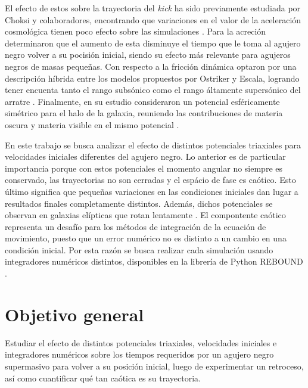 	El efecto de estos sobre la trayectoria del \textit{kick} ha sido previamente estudiada por Choksi y colaboradores, encontrando que variaciones en el valor de la aceleraci\'on cosmol\'ogica tienen poco efecto sobre las simulaciones  \cite{choksi2017recoiling}. Para la acreci\'on determinaron que el aumento de esta disminuye el tiempo que le toma al agujero negro volver a su pocisi\'on inicial, siendo su efecto m\'as relevante para agujeros negros de masas peque\~nas. Con respecto a la fricci\'on din\'amica optaron por una descripci\'on h\'ibrida entre los modelos propuestos por Ostriker y Escala, logrando tener encuenta tanto el rango subs\'onico como el rango \'altamente supers\'onico del arratre \cite{ostriker1999dynamical, escala2005role}. Finalmente, en su estudio consideraron un potencial esf\'ericamente sim\'etrico para el halo de la galaxia, reuniendo las contribuciones de materia oscura y materia visible en el mismo potencial \cite{choksi2017recoiling}.
		
	En este trabajo se busca analizar el efecto de distintos potenciales triaxiales para velocidades iniciales diferentes del agujero negro. Lo anterior es de particular importancia porque con estos potenciales el momento angular no siempre es conservado, las trayectorias no son cerradas y el esp\'acio de fase es ca\'otico. Esto \'ultimo significa que pequeñas variaciones en las condiciones iniciales dan lugar a resultados finales completamente distintos. Adem\'as, dichos potenciales se observan en galaxias el\'ipticas que rotan lentamente \cite{buote2002chandra, binney1978elliptical}. El compontente ca\'otico representa un desaf\'io para los m\'etodos de integraci\'on de la ecuaci\'on de movimiento, puesto que un error num\'erico no es distinto a un cambio en una condici\'on inicial. Por esta raz\'on se busca realizar cada simulaci\'on usando integradores num\'ericos distintos, disponibles en la librer\'ia de Python REBOUND \cite{larson2017modeling}.
	
\section{Objetivo general}
	Estudiar el efecto de distintos potenciales triaxiales, velocidades iniciales e integradores num\'ericos sobre los tiempos requeridos por un agujero negro supermasivo para volver a su posici\'on inicial, luego de experimentar un retroceso, as\'i como cuantificar qué tan caótica es su trayectoria.
	
